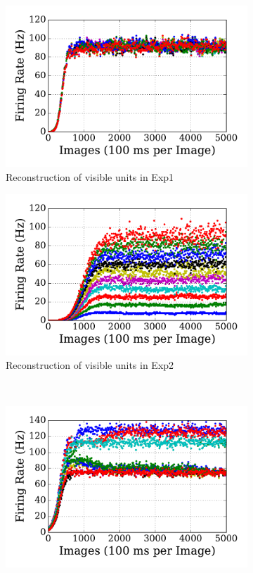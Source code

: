 \begin{figure}
\begin{subfigure}[t]{0.48\textwidth}
		\includegraphics[width=\textwidth]{pics_sdlm/01_exp_SAE_Orig_long/exp1_recon_s.pdf}
		\caption{Reconstruction of visible units in Exp1}
	\end{subfigure}
	\begin{subfigure}[t]{0.48\textwidth}
		\includegraphics[width=\textwidth]{pics_sdlm/01_exp_SAE_Orig_long/exp2_recon_s.pdf}
		\caption{Reconstruction of visible units in Exp2}
	\end{subfigure}\\
	\begin{subfigure}[t]{0.48\textwidth}
		\includegraphics[width=\textwidth]{pics_sdlm/01_exp_SAE_Orig_long/exp1_hid_s.pdf}

\end{subfigure}
\end{figure}
